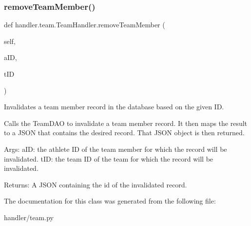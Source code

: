 \subsubsection{\texorpdfstring{remove\+Team\+Member()}{removeTeamMember()}}
{\footnotesize\ttfamily def handler.\+team.\+Team\+Handler.\+remove\+Team\+Member (\begin{DoxyParamCaption}\item[{}]{self,  }\item[{}]{a\+ID,  }\item[{}]{t\+ID }\end{DoxyParamCaption})}

\begin{DoxyVerb}Invalidates a team member record in the database based on the given ID.

Calls the TeamDAO to invalidate a team member record. It then
maps the result to a JSON that contains the desired record. That JSON 
object is then returned.

Args:
    aID: the athlete ID of the team member for which the  record will be invalidated.
    tID: the team ID of the team for which the  record will be invalidated.
    
Returns:
    A JSON containing the id of the invalidated record.
\end{DoxyVerb}
 

The documentation for this class was generated from the following file\+:\begin{DoxyCompactItemize}
\item 
handler/team.\+py\end{DoxyCompactItemize}

